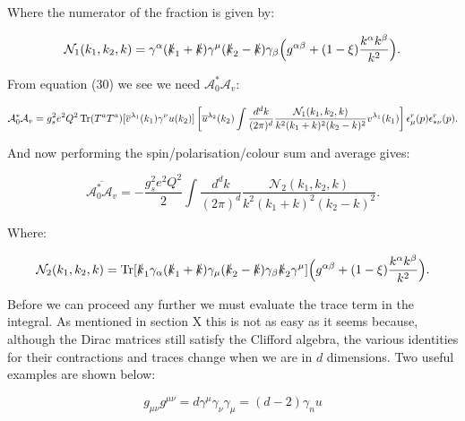 	Where the numerator of the fraction is given by:

	\begin{equation}
	\mathcal{N}_1(k_1, k_2, k) = \gamma^\alpha(\slashed k_1 + \slashed k)\gamma^\mu(\slashed k_2 -
	\slashed k)\gamma_\beta\Big(g^{\alpha\beta} + (1-\xi)\frac{k^\alpha k^\beta}{k^2}\Big).
	\end{equation}

	From equation (30) we see we need $\mathcal{A}_0^*\mathcal{A}_v$:

	\begin{equation}
		\mathcal{A}_0^*\mathcal{A}_v = g_s^2e^2Q^2\operatorname{Tr}(T^aT^a)[\overline{v}^{\lambda_1}(k_1)\gamma^\nu u(k_2)]
		\left[\overline{u}^{\lambda_2}(k_2)\int\frac{d^{d}k}{(2\pi)^{d}}\frac{\mathcal{N}_1(k_1, k_2, k)}
		{k^2(k_1+k)^2(k_2-k)^2}v^{\lambda_1}(k_1)\right]\epsilon^r_{\mu}(p)\epsilon^r_{*\nu}(p).
	\end{equation}

	And now performing the spin/polarisation/colour sum and average gives:

	\begin{equation}
	\overline{\mathcal{A}_0^*\mathcal{A}_v} = -\frac{g_s^2e^2Q^2}{2}\int\frac{d^{d}k}
	{(2\pi)^{d}}\frac{\mathcal{N}_2(k_1, k_2,k)}{k^2(k_1+k)^2(k_2-k)^2}.
	\end{equation}

	Where:

	\begin{equation}
	\mathcal{N}_2(k_1, k_2, k) = \operatorname{Tr}[\slashed k_1 \gamma_\alpha(\slashed k_1 + \slashed k)\gamma_\mu
	(\slashed k_2 - \slashed k)\gamma_\beta\slashed k_2\gamma^\mu]\Big(g^{\alpha\beta} + (1-\xi)\frac{k^\alpha k^\beta}{k^2}\Big).
	\end{equation}

	Before we can proceed any further we must evaluate the trace term in the integral.  As mentioned in section X
	this is not as easy as it seems because, although the Dirac matrices still satisfy the Clifford algebra, the
	various identities for their contractions and traces change when we are in $d$ dimensions.  Two useful examples are shown below:

	\begin{subequations}
	\begin{equation}
	g_{\mu\nu}g^{\mu\nu} = d
	\end{equation}
	\begin{equation}
	\gamma^\mu\gamma_\nu\gamma_\mu = (d-2)\gamma_nu
	\end{equation}
	\end{subequations}

